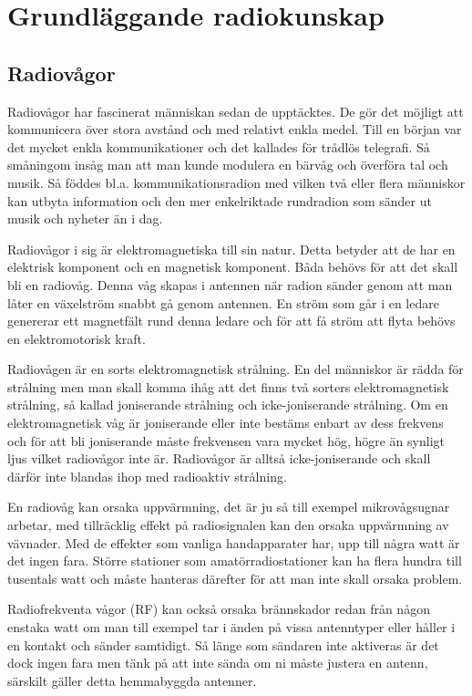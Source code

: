 \chapter{Grundläggande radiokunskap}

\section{Radiovågor}

Radiovågor har fascinerat människan sedan de upptäcktes. De gör det möjligt att kommunicera över stora avstånd och med relativt enkla medel. Till en början var det mycket enkla kommunikationer och det kallades för trådlös telegrafi. Så småningom insåg man att man kunde modulera en bärvåg och överföra tal och musik. Så föddes bl.a. kommunikationsradion med vilken två eller flera människor kan utbyta information och den mer enkelriktade rundradion som sänder ut musik och nyheter än i dag.

Radiovågor i sig är elektromagnetiska till sin natur. Detta betyder att de har en elektrisk komponent och en magnetisk komponent. Båda behövs för att det skall bli en radiovåg. Denna våg skapas i antennen när radion sänder genom att man låter en växelström snabbt gå genom antennen. En ström som går i en ledare genererar ett magnetfält rund denna ledare och för att få ström att flyta behövs en elektromotorisk kraft.

Radiovågen är en sorts elektromagnetisk strålning. En del människor är rädda för strålning men man skall komma ihåg att det finns två sorters elektromagnetisk strålning, så kallad joniserande strålning och icke-joniserande strålning. Om en elektromagnetisk våg är joniserande eller inte bestäms enbart av dess frekvens och för att bli joniserande måste frekvensen vara mycket hög, högre än synligt ljus vilket radiovågor inte är. Radiovågor är alltså icke-joniserande och skall därför inte blandas ihop med radioaktiv strålning.

En radiovåg kan orsaka uppvärmning, det är ju så till exempel mikrovågsugnar arbetar, med tillräcklig effekt på radiosignalen kan den orsaka uppvärmning av vävnader. Med de effekter som vanliga handapparater har, upp till några watt är det ingen fara. Större stationer som amatörradiostationer kan ha flera hundra till tusentals watt och måste hanteras därefter för att man inte skall orsaka problem.

Radiofrekventa vågor (RF) kan också orsaka brännskador redan från någon enstaka watt om man till exempel tar i änden på vissa antenntyper eller håller i en kontakt och sänder samtidigt. Så länge som sändaren inte aktiveras är det dock ingen fara men tänk på att inte sända om ni måste justera en antenn, särskilt gäller detta hemmabyggda antenner.

